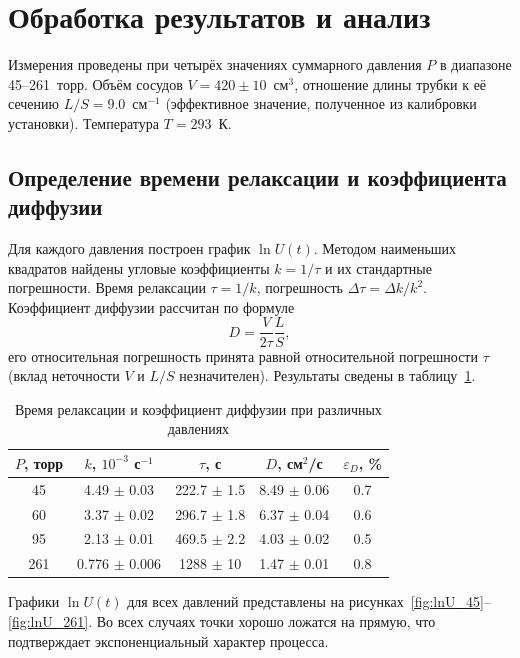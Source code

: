 \documentclass[a4paper, 12pt]{article}
\begin{document}
\section{Обработка результатов и анализ}

Измерения проведены при четырёх значениях суммарного давления $P$ в диапазоне 45--261~торр. Объём сосудов $V = 420 \pm 10$~см$^3$, отношение длины трубки к её сечению $L/S = 9.0$~см$^{-1}$ (эффективное значение, полученное из калибровки установки). Температура $T = 293$~К.

\subsection{Определение времени релаксации и коэффициента диффузии}
Для каждого давления построен график $\ln U(t)$. Методом наименьших квадратов найдены угловые коэффициенты $k = 1/\tau$ и их стандартные погрешности. Время релаксации $\tau = 1/k$, погрешность $\Delta\tau = \Delta k / k^2$. Коэффициент диффузии рассчитан по формуле
\[
    D = \frac{V}{2\tau} \frac{L}{S},
\]
его относительная погрешность принята равной относительной погрешности $\tau$ (вклад неточности $V$ и $L/S$ незначителен). Результаты сведены в таблицу~\ref{tab:tau_D}.

\begin{table}[h]
\centering
\caption{Время релаксации и коэффициент диффузии при различных давлениях}
\label{tab:tau_D}
\begin{tabular}{c c c c c}
\toprule
$P$, торр & $k$, $10^{-3}$ с$^{-1}$ & $\tau$, с & $D$, см$^2$/с & $\varepsilon_D$, \% \\
\midrule
45  & 4.49 $\pm$ 0.03 & 222.7 $\pm$ 1.5 & 8.49 $\pm$ 0.06 & 0.7 \\
60  & 3.37 $\pm$ 0.02 & 296.7 $\pm$ 1.8 & 6.37 $\pm$ 0.04 & 0.6 \\
95  & 2.13 $\pm$ 0.01 & 469.5 $\pm$ 2.2 & 4.03 $\pm$ 0.02 & 0.5 \\
261 & 0.776 $\pm$ 0.006 & 1288 $\pm$ 10 & 1.47 $\pm$ 0.01 & 0.8 \\
\bottomrule
\end{tabular}
\end{table}

Графики $\ln U(t)$ для всех давлений представлены на рисунках~\ref{fig:lnU_45}--\ref{fig:lnU_261}. Во всех случаях точки хорошо ложатся на прямую, что подтверждает экспоненциальный характер процесса.
\end{document}
